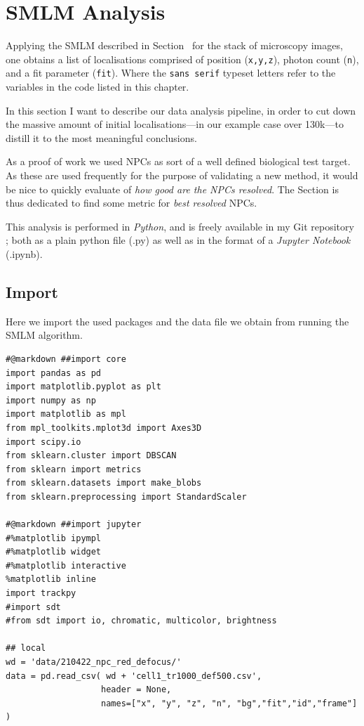 \documentclass[11pt, a4paper, oneside, twocolumn]{report}
\renewcommand{\tt}{\texttt}
\renewcommand{\t}{\todo}
\newcommand{\e}{\emph}
\begin{document}
\section{SMLM Analysis}

Applying the SMLM described in Section~\t{sec} for the stack of
microscopy images, one obtains a list of localisations comprised of
position (\tt{x,y,z}), photon count (\tt{n}), and a fit parameter
(\tt{fit}). Where the \tt{sans serif} typeset letters refer to the
variables in the code listed in this chapter.

In this section I want to describe our data analysis pipeline, in
order to cut down the massive amount of initial localisations---in our
example case over 130k---to distill it to the most meaningful
conclusions.

As a proof of work we used NPCs as sort of a well defined biological
test target. As these are used frequently for the purpose of
validating a new method, it would be nice to quickly evaluate of
\e{how good are the NPCs resolved}. The Section \t{sec} is thus
dedicated to find some metric for \e{best resolved} NPCs.

This analysis is performed in \e{Python}, and is freely available in
my Git repository \t{git}; both as a plain python file (.py) as well
as in the format of a \e{Jupyter Notebook} (.ipynb).

\t{npc image}

\onecolumn



\subsection{Import}

Here we import the used packages and the data file we obtain from
running the SMLM algorithm.

\begin{verbatim}
#@markdown ##import core
import pandas as pd
import matplotlib.pyplot as plt
import numpy as np
import matplotlib as mpl
from mpl_toolkits.mplot3d import Axes3D
import scipy.io
from sklearn.cluster import DBSCAN
from sklearn import metrics
from sklearn.datasets import make_blobs
from sklearn.preprocessing import StandardScaler

#@markdown ##import jupyter
#%matplotlib ipympl
#%matplotlib widget
#%matplotlib interactive
%matplotlib inline
import trackpy
#import sdt
#from sdt import io, chromatic, multicolor, brightness
    
## local
wd = 'data/210422_npc_red_defocus/'
data = pd.read_csv( wd + 'cell1_tr1000_def500.csv',
                   header = None,
                   names=["x", "y", "z", "n", "bg","fit","id","frame"] )
\end{verbatim}
\end{document}
